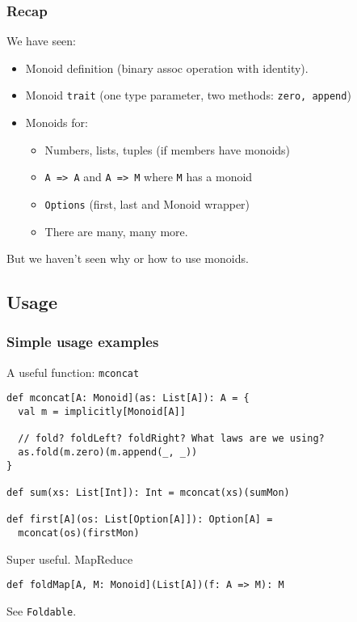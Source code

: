 \documentclass{beamer}
\begin{document}
\begin{frame} \frametitle{Recap}
  We have seen:
  \begin{itemize}
    \item Monoid definition (binary assoc operation with identity).
    \item Monoid \texttt{trait} (one type parameter,
      two methods: \texttt{zero, append})
    \item Monoids for:
      \begin{itemize}
      \item Numbers, lists, tuples (if members have monoids)
      \item \texttt{A => A} and \texttt{A => M} where \texttt{M} has a monoid
      \item \texttt{Options} (first, last and Monoid wrapper)
      \item There are many, many more.
      \end{itemize}
  \end{itemize}

  \begin{block}{}
    \centering
    But we haven't seen \alert{why} or \alert{how} to use monoids.
  \end{block}
\end{frame}

\subsection{Usage}
\begin{frame}[fragile]
  \frametitle{Simple usage examples}

  \begin{block}{A useful function: \texttt{mconcat}}
  \begin{lstlisting}
def mconcat[A: Monoid](as: List[A]): A = {
  val m = implicitly[Monoid[A]]

  // fold? foldLeft? foldRight? What laws are we using?
  as.fold(m.zero)(m.append(_, _))
}

def sum(xs: List[Int]): Int = mconcat(xs)(sumMon)

def first[A](os: List[Option[A]]): Option[A] =
  mconcat(os)(firstMon)
  \end{lstlisting}
  \end{block}

  \begin{block}{Super useful. MapReduce}
  \begin{lstlisting}
def foldMap[A, M: Monoid](List[A])(f: A => M): M
  \end{lstlisting}
  \end{block}
  See \texttt{Foldable}.
\end{frame}
\end{document}

